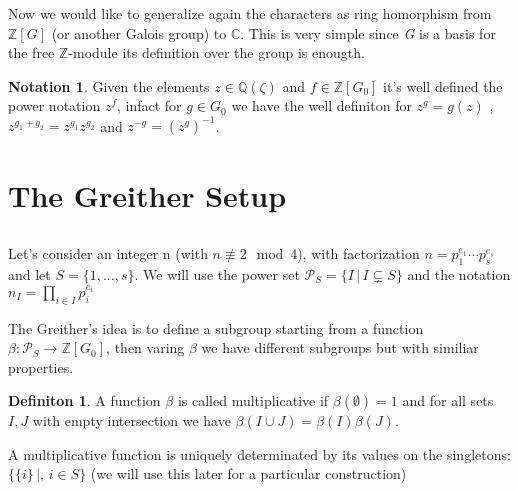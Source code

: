 \documentclass[]{article}
\theoremstyle{plain}
\theoremstyle{remark}
\theoremstyle{definition}
\newtheorem{deff}[teo]{Definiton}
\newtheorem*{nota}{Notation}
\newcommand{\PS}{\mathcal{P}_S}
\newcommand{\Z}{\mathbb{Z}}
\newcommand{\Q}{\mathbb{Q}}
\newcommand{\C}{\mathbb{C}}
\begin{document}
 	Now we would like to generalize again the characters as ring homorphism from $ \Z[G] $ (or another Galois group) to $ \C $. This is very simple since \textit{G} is a basis for the free $ \Z $-module its definition over the group is enougth. 
	
	\begin{nota}
		Given the elements $ z \in \Q (\zeta) $ and $ f \in \Z[G_0]  $ it's well defined the power notation $ z^f $, infact for $ g\in G_0 $ we have the well definiton for $ z^g = g(z) $ , $ z ^{g_1 + g_2}= z^{g_1} z^{g_2} $ and $ z^{-g} = (z^g)^{-1} $. 
	\end{nota}
	

\section{The Greither Setup}

	\subsection*{}
	Let's consider an integer n (with $n \not \equiv 2 \mod 4$), with factorization $ n= p_1 ^{e_1} \cdots p_s ^{e_s} $ and let $ S = \{1, ... , s \}$. We will use the power set $ \PS = \{ I \,|\, I \subsetneq S\}$ and the notation $ n_I = \prod_{i \in I} p_i ^{e_i} $ 
	
	The Greither's idea is to define a subgroup starting from a function $ \beta : \PS \to \Z[G_0] $, then varing $\beta$ we have different subgroups but with similiar properties. 
	
	\begin{deff}
		A function $\beta$ is called multiplicative if $ \beta (\emptyset) = 1 $ and for all sets $ I,J $ with empty intersection we have $ \beta (I\cup J) = \beta(I) \beta(J)$.
	\end{deff}

	A multiplicative function is uniquely determinated by its values on the singletons: $ \{\{i\} \,|,\, i \in S\} $ (we will use this later for a particular construction)
\end{document}
